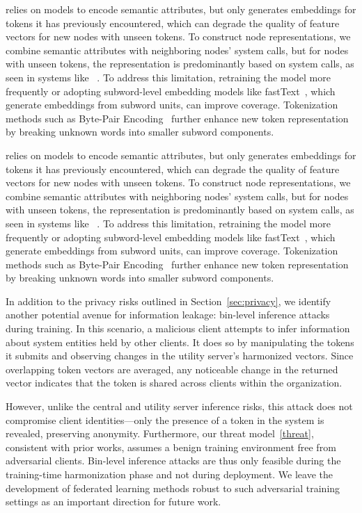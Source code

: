  \Sys relies on \wordvec models to encode semantic attributes, but \wordvec only generates embeddings for tokens it has previously encountered, which can degrade the quality of feature vectors for new nodes with unseen tokens. To construct node representations, we combine semantic attributes with neighboring nodes' system calls, but for nodes with unseen tokens, the representation is predominantly based on system calls, as seen in systems like \threatrace~\cite{wang2022threatrace}. To address this limitation, retraining the \wordvec model more frequently or adopting subword-level embedding models like fastText~\cite{joulin2016bag}, which generate embeddings from subword units, can improve coverage. Tokenization methods such as Byte-Pair Encoding~\cite{araabi2022effective} further enhance new token representation by breaking unknown words into smaller subword components.

 \Sys relies on \wordvec models to encode semantic attributes, but \wordvec only generates embeddings for tokens it has previously encountered, which can degrade the quality of feature vectors for new nodes with unseen tokens. To construct node representations, we combine semantic attributes with neighboring nodes' system calls, but for nodes with unseen tokens, the representation is predominantly based on system calls, as seen in systems like \threatrace~\cite{wang2022threatrace}. To address this limitation, retraining the \wordvec model more frequently or adopting subword-level embedding models like fastText~\cite{joulin2016bag}, which generate embeddings from subword units, can improve coverage. Tokenization methods such as Byte-Pair Encoding~\cite{araabi2022effective} further enhance new token representation by breaking unknown words into smaller subword components.

In addition to the privacy risks outlined in Section~\ref{sec:privacy}, we identify another potential avenue for information leakage: bin-level inference attacks during training. In this scenario, a malicious client attempts to infer information about system entities held by other clients. It does so by manipulating the tokens it submits and observing changes in the utility server's harmonized vectors. Since overlapping token vectors are averaged, any noticeable change in the returned vector indicates that the token is shared across clients within the organization.  

However, unlike the central and utility server inference risks, this attack does not compromise client identities—only the presence of a token in the system is revealed, preserving anonymity. Furthermore, our threat model~\ref{threat}, consistent with prior \pids works, assumes a benign training environment free from adversarial clients. Bin-level inference attacks are thus only feasible during the training-time harmonization phase and not during deployment. We leave the development of federated learning methods robust to such adversarial training settings as an important direction for future work.

